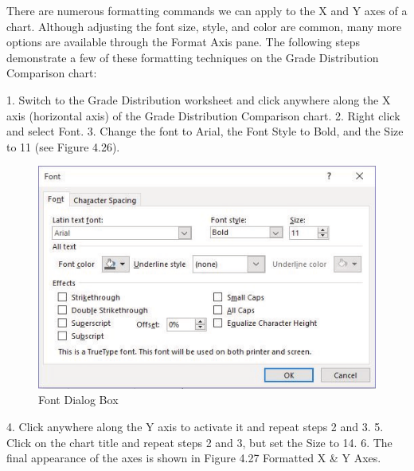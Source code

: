 There are numerous formatting commands we can apply to the X and Y axes of a chart. Although
adjusting the font size, style, and color are common, many more options are available through the
Format Axis pane. The following steps demonstrate a few of these formatting techniques on the
Grade Distribution Comparison chart:

1. Switch to the Grade Distribution worksheet and click anywhere along the X axis (horizontal
axis) of the Grade Distribution Comparison chart.
2. Right click and select Font.
3. Change the font to Arial, the Font Style to Bold, and the Size to 11 (see Figure 4.26).



\begin{figure}[H]
	\centering
	\includegraphics[width=\maxwidth{.95\linewidth}]{gfx/ch04_fig27}
	\caption{Font Dialog Box}
	\label{04:fig27}
\end{figure}





4. Click anywhere along the Y axis to activate it and repeat steps 2 and 3.
5. Click on the chart title and repeat steps 2 and 3, but set the Size to 14.
6. The final appearance of the axes is shown in Figure 4.27 Formatted X \& Y Axes.



